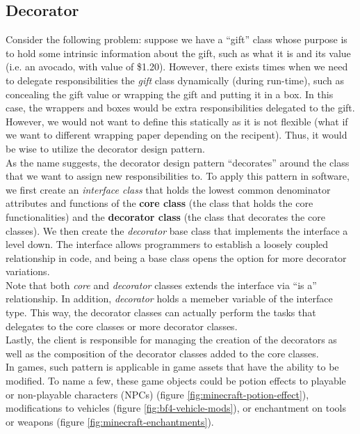 \begin{multicols}{2}
\subsection{Decorator}

Consider the following problem: suppose we have a ``gift'' class whose purpose is to hold some intrinsic information about the gift, such as what it is and its value (i.e. an avocado, with value of \$1.20). However, there exists times when we need to delegate responsibilities the \textit{gift} class dynamically (during run-time), such as concealing the gift value or wrapping the gift and putting it in a box. In this case, the wrappers and boxes would be extra responsibilities delegated to the gift. However, we would not want to define this statically as it is not flexible (what if we want to different wrapping paper depending on the recipent). Thus, it would be wise to utilize the decorator design pattern.\bs
\\
As the name suggests, the decorator design pattern ``decorates'' around the class that we want to assign new responsibilities to. To apply this pattern in software, we first create an \textit{interface class} that holds the lowest common denominator attributes and functions of the \textbf{core class} (the class that holds the core functionalities) and the \textbf{decorator class} (the class that decorates the core classes). We then create the \textit{decorator} base class that implements the interface a level down. The interface allows programmers to establish a loosely coupled relationship in code, and being a base class opens the option for more decorator variations.\bs
\\
Note that both \textit{core} and \textit{decorator} classes extends the interface via ``is a'' relationship. In addition, \textit{decorator} holds a memeber variable of the interface type. This way, the decorator classes can actually perform the tasks that delegates to the core classes or more decorator classes.\bs
\\
Lastly, the client is responsible for managing the creation of the decorators as well as the composition of the decorator classes added to the core classes.\bs
\\
In games, such pattern is applicable in game assets that have the ability to be modified. To name a few, these game objects could be potion effects to playable or non-playable characters (NPCs) (figure \ref{fig:minecraft-potion-effect}), modifications to vehicles (figure \ref{fig:bf4-vehicle-mods}), or enchantment on tools or weapons (figure \ref{fig:minecraft-enchantments}).\bs

\end{multicols}
